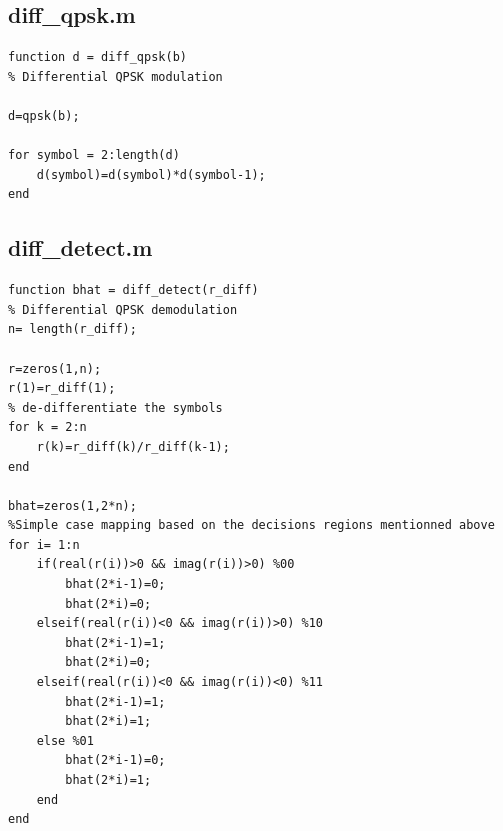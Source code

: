 \documentclass[a4paper,12pt]{article}
\begin{document}
\subsection*{diff\_qpsk.m}
\begin{verbatim}
function d = diff_qpsk(b)
% Differential QPSK modulation

d=qpsk(b);

for symbol = 2:length(d)  
    d(symbol)=d(symbol)*d(symbol-1);
end
\end{verbatim}

\subsection*{diff\_detect.m}
\begin{verbatim}
function bhat = diff_detect(r_diff)
% Differential QPSK demodulation
n= length(r_diff);

r=zeros(1,n);
r(1)=r_diff(1);
% de-differentiate the symbols
for k = 2:n
    r(k)=r_diff(k)/r_diff(k-1);
end
    
bhat=zeros(1,2*n);
%Simple case mapping based on the decisions regions mentionned above
for i= 1:n
    if(real(r(i))>0 && imag(r(i))>0) %00
        bhat(2*i-1)=0;
        bhat(2*i)=0;
    elseif(real(r(i))<0 && imag(r(i))>0) %10
        bhat(2*i-1)=1;
        bhat(2*i)=0;
    elseif(real(r(i))<0 && imag(r(i))<0) %11
        bhat(2*i-1)=1;
        bhat(2*i)=1;
    else %01
        bhat(2*i-1)=0;
        bhat(2*i)=1;
    end
end

\end{verbatim}

\end{document}
